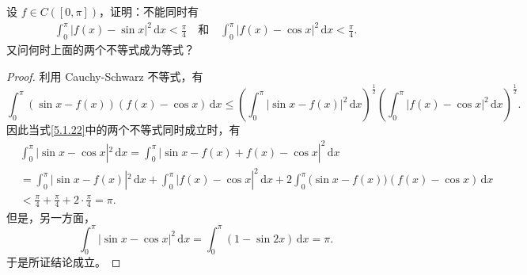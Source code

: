 \documentclass[../../main.tex]{subfiles}%
\begin{document}
\begin{example}
设 \( f \in C([0,\pi]) \)，证明：不能同时有
\begin{align}
\int_{0}^{\pi} |f(x) - \sin x|^2 \, \mathrm{d}x < \frac{\pi}{4}
\quad \text{和} \quad
\int_{0}^{\pi} |f(x) - \cos x|^2 \, \mathrm{d}x < \frac{\pi}{4}. \label{5.1.22}
\end{align}
又问何时上面的两个不等式成为等式？
\end{example}
\begin{proof}

利用 Cauchy-Schwarz 不等式，有
\[
\int_{0}^{\pi} (\sin x - f(x))(f(x) - \cos x) \, \mathrm{d}x
\leqslant \left( \int_{0}^{\pi} |\sin x - f(x)|^2 \, \mathrm{d}x \right)^{\frac{1}{2}} \left( \int_{0}^{\pi} |f(x) - \cos x|^2 \, \mathrm{d}x \right)^{\frac{1}{2}}.
\]
因此当式\eqref{5.1.22}中的两个不等式同时成立时，有
\begin{align*}
&\int_0^{\pi}{|\sin x}-\cos x|^2\,\mathrm{d}x=\int_0^{\pi}{|\sin x}-f(x)+f(x)-\cos x|^2\,\mathrm{d}x
\\
&=\int_0^{\pi}{|\sin x}-f(x)|^2\,\mathrm{d}x+\int_0^{\pi}{|f(x)}-\cos x|^2\,\mathrm{d}x+2\int_0^{\pi}{(\sin x}-f(x))(f(x)-\cos x)\,\mathrm{d}x
\\
&<\frac{\pi}{4}+\frac{\pi}{4}+2\cdot \frac{\pi}{4}=\pi .
\end{align*}
但是，另一方面，
\[
\int_{0}^{\pi} |\sin x - \cos x|^2 \, \mathrm{d}x = \int_{0}^{\pi} (1 - \sin 2x) \, \mathrm{d}x = \pi.
\]
于是所证结论成立。


\end{proof}
\end{document}

